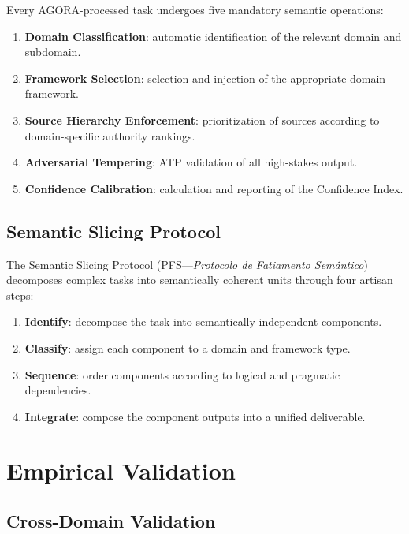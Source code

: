 \documentclass[12pt,a4paper]{article}
\begin{document}
Every AGORA-processed task undergoes five mandatory semantic operations:

\begin{enumerate}
  \item \textbf{Domain Classification}: automatic identification of the relevant domain and subdomain.
  \item \textbf{Framework Selection}: selection and injection of the appropriate domain framework.
  \item \textbf{Source Hierarchy Enforcement}: prioritization of sources according to domain-specific authority rankings.
  \item \textbf{Adversarial Tempering}: ATP validation of all high-stakes output.
  \item \textbf{Confidence Calibration}: calculation and reporting of the Confidence Index.
\end{enumerate}

\subsection{Semantic Slicing Protocol}

The Semantic Slicing Protocol (PFS---\emph{Protocolo de Fatiamento Sem\^{a}ntico}) decomposes complex tasks into semantically coherent units through four artisan steps:

\begin{enumerate}
  \item \textbf{Identify}: decompose the task into semantically independent components.
  \item \textbf{Classify}: assign each component to a domain and framework type.
  \item \textbf{Sequence}: order components according to logical and pragmatic dependencies.
  \item \textbf{Integrate}: compose the component outputs into a unified deliverable.
\end{enumerate}


\section{Empirical Validation}
\label{sec:empirical}

\subsection{Cross-Domain Validation}
\end{document}
